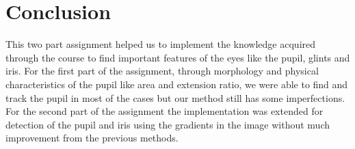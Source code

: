 \section{Conclusion}
This two part assignment helped us to implement the knowledge acquired through the course to find important features of the eyes like the pupil, glints and iris. For the first part of the assignment, through morphology and physical characteristics of the pupil like area and extension ratio, we were able to find and track the pupil in most of the cases but our method still has some imperfections. For the second part of the assignment the implementation was extended for detection of the pupil and iris using the gradients in the image without much improvement from the previous methods.